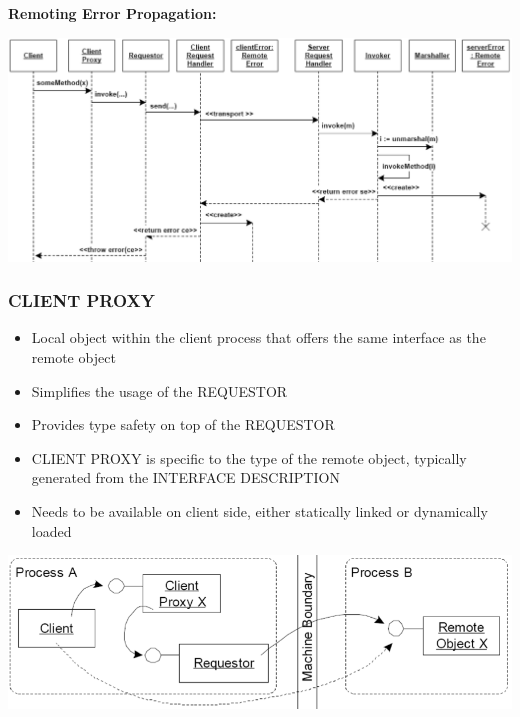 \documentclass[10pt]{article}
\begin{document}
\textbf{Remoting Error Propagation:}
\begin{center}
	\includegraphics[scale=0.25]{images/remoting-error-propagation.png}
\end{center}
\subsubsection{CLIENT PROXY}
\begin{itemize}
	\item Local object within the client process that offers the same interface as the remote object
	\item Simplifies the usage of the REQUESTOR
	\item Provides type safety on top of the REQUESTOR
	\item CLIENT PROXY is specific to the type of the remote object, typically generated from the INTERFACE DESCRIPTION
	\item Needs to be available on client side, either statically linked or dynamically loaded
\end{itemize}
\begin{center}
	\includegraphics[scale=0.2]{images/client-proxy.png}
\end{center}
\end{document}
